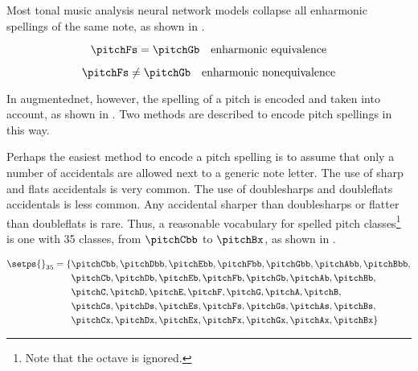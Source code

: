 
Most tonal music analysis neural network models collapse all
enharmonic spellings of the same note, as shown in
.

\begin{equation}
    \label{eq:enharmonic_equivalence}
    \pitchFs = \pitchGb \quad \text{enharmonic equivalence}
\end{equation}

\begin{equation}
    \label{eq:enharmonic_nonequivalence}
    \pitchFs \neq \pitchGb \quad \text{enharmonic nonequivalence}
\end{equation}

In \gls{augmentednet}, however, the spelling of a pitch is
encoded and taken into account, as shown in
. Two methods are described
to encode pitch spellings in this way.



Perhaps the easiest method to encode a pitch spelling is to
assume that only a number of accidentals are allowed next to
a generic note letter. The use of \gls{sharp} and
\glspl{flat} accidentals is very common. The use of
\glspl{doublesharp} and \glspl{doubleflat} accidentals is
less common. Any accidental sharper than \glspl{doublesharp}
or flatter than \glspl{doubleflat} is rare. Thus, a
reasonable vocabulary for spelled pitch
classes\footnote{Note that the octave is ignored.} is one
with 35 classes, from $\pitchCbb$ to $\pitchBx$, as shown in
.

\begin{equation}
    \label{eq:pitch_spelling_35}
    \begin{split}
    \setps{}_{35} = \{ & \pitchCbb, \pitchDbb, \pitchEbb, \pitchFbb, \pitchGbb, \pitchAbb, \pitchBbb, \\
    & \pitchCb, \pitchDb, \pitchEb, \pitchFb, \pitchGb, \pitchAb, \pitchBb, \\
    & \pitchC, \pitchD, \pitchE, \pitchF, \pitchG, \pitchA, \pitchB, \\
    & \pitchCs, \pitchDs, \pitchEs, \pitchFs, \pitchGs, \pitchAs, \pitchBs, \\
    & \pitchCx, \pitchDx, \pitchEx, \pitchFx, \pitchGx, \pitchAx, \pitchBx \}
    \end{split}
\end{equation}

